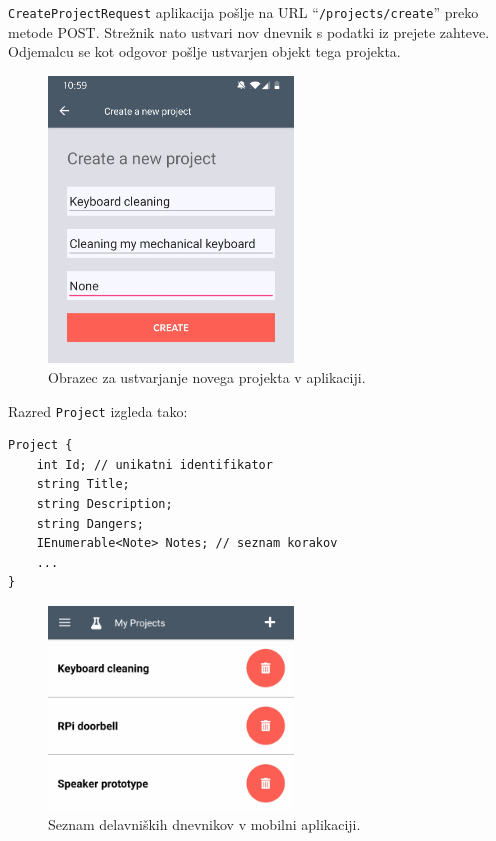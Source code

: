 \documentclass[a4paper, 12pt]{book}
\begin{document}
\texttt{CreateProjectRequest} aplikacija pošlje na URL \enquote{\texttt{/projects/create}} preko metode POST.
Strežnik nato ustvari nov dnevnik s podatki iz prejete zahteve.
Odjemalcu se kot odgovor pošlje ustvarjen objekt tega projekta.

\begin{figure}[H]
\begin{center}
\includegraphics[width=6.5cm]{app_create_new_small}
\end{center}
	\caption{Obrazec za ustvarjanje novega projekta v aplikaciji.}
\label{app_create_new}
\end{figure}


\noindent Razred \texttt{Project} izgleda tako:

\begin{verbatim}
Project { 
    int Id; // unikatni identifikator 
    string Title; 
    string Description; 
    string Dangers; 
    IEnumerable<Note> Notes; // seznam korakov 
    ... 
}
\end{verbatim}

\begin{figure}[H]
\begin{center}
\includegraphics[width=6.5cm]{app_dashboard}
\end{center}
	\caption{Seznam delavniških dnevnikov v mobilni aplikaciji.}
\label{app_dashboard}
\end{figure}
\end{document}
